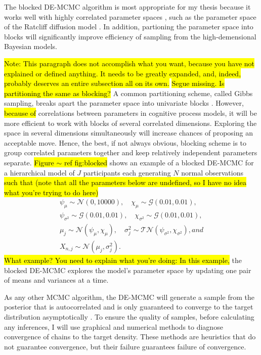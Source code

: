 \documentclass[12pt]{article}
\newcommand{\trish}[1]{\textrm{\hl{#1}}}
\begin{document}
The blocked DE-MCMC algorithm is most appropriate for my
thesis because it works well with highly correlated parameter spaces
\citep{TurSed2013}, such as the parameter space of the
Ratcliff diffusion model \citep{RatTue2002}. In addition, partioning the parameter space into blocks  will significantly improve efficiency of sampling from the high-demensional Bayesian models.

\trish{Note: This paragraph does not accomplish what you want, because
you have not explained or defined anything. It needs to be greatly
expanded, and, indeed, probably deserves an entire subsection all on
its own.}
%
\trish{Segue missing.  Is partitioning the same as blocking?} A common
partitioning scheme, called Gibbs sampling, breaks apart the parameter
space into univariate blocks
\citep{RobCas2004,GamLop2006,GelCar2013}. However, \trish{because of}
correlations between parameters in cognitive process models, it will
be more efficient to work with blocks of several correlated
dimensions. Exploring the space in several dimensions simultaneously
will increase chances of proposing an acceptable move. Hence, the
best, if not always obvious, blocking scheme is to group correlated
parameters together and keep relatively independent parameters
separate. \trish{Figure $\sim$ ref fig:blocked} shows an example of a
blocked DE-MCMC for a hierarchical model of $J$ participants each
generating $N$ normal observations \trish{such that (note that all the
parameters below are undefined, so I have no idea what you're trying
to do here)}
%
\begin{gather}
\psi_{\mu} \sim \mathcal{N}(0, 10000), \quad 
\chi_{\mu} \sim \mathcal{G}(0.01,0.01), \nonumber \\
\psi_{\sigma^2} \sim \mathcal{G}(0.01, 0.01), 
\quad \chi_{\sigma^2} \sim \mathcal{G}(0.01,0.01), \nonumber \\
\mu_j \sim \mathcal{N}(\psi_{\mu}, \chi_{\mu}), 
\quad \sigma_j^2 \sim \mathcal{TN}(\psi_{\sigma^2}, \chi_{\sigma^2}), and \nonumber \\
X_{n, j} \sim \mathcal{N}(\mu_j, \sigma_j^2). \nonumber
\end{gather}
%
\trish{What example? You need to explain what you're doing: In this
example,} the blocked DE-MCMC explores the model's parameter space by
updating one pair of means and variances at a time.

As any other MCMC algorithm, the DE-MCMC will generate a sample from
the posterior that is autocorrelated and is only guaranteed to
converge to the target distribution asymptotically
\citep{RobCas2004,GamLop2006}. To ensure the quality of samples,
before calculating any inferences, I will use graphical and numerical
methods to diagnose convergence of chains to the target density. These
methods are heuristics that do not guarantee convergence, but their
failure guarantees failure of convergence.
    
\end{document}

